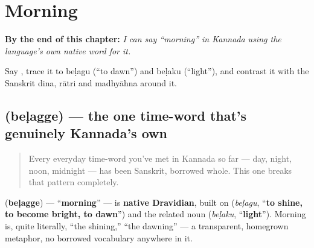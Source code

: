 
\chapter{Morning}
\label{ch:ka-morning}

\begin{chapteropening}
\textbf{By the end of this chapter:} \emph{I can say \textquotedblleft{}morning\textquotedblright{} in Kannada using the language's own native word for it.}

Say , trace it to beḷagu (\textquotedblleft{}to dawn\textquotedblright{}) and beḷaku (\textquotedblleft{}light\textquotedblright{}), and contrast it with the Sanskrit dina, rātri and madhyāhna around it.
\end{chapteropening}

\section[\texorpdfstring{\kn{ಬೆಳಗ್ಗೆ} (beḷagge)}{ಬೆಳಗ್ಗೆ (beḷagge)}]{ (beḷagge) — the one time-word that's genuinely Kannada's own}

\label{lesson:KA-C26-belagge}



\begin{quote}
Every everyday time-word you've met in Kannada so far — day, night, noon, midnight — has been Sanskrit, borrowed whole. This one breaks that pattern completely.
\end{quote}

\begin{cousinweb}
\textbf{} (\textbf{beḷagge}) — \textquotedblleft{}\textbf{morning}\textquotedblright{} — is \textbf{native Dravidian}, built on \textbf{} (\emph{beḷagu}, \textquotedblleft{}\textbf{to shine, to become bright, to dawn}\textquotedblright{}) and the related noun \textbf{} (\emph{beḷaku}, \textquotedblleft{}\textbf{light}\textquotedblright{}). Morning is, quite literally, \textquotedblleft{}the shining,\textquotedblright{} \textquotedblleft{}the dawning\textquotedblright{} — a transparent, homegrown metaphor, no borrowed vocabulary anywhere in it.
\end{cousinweb}

